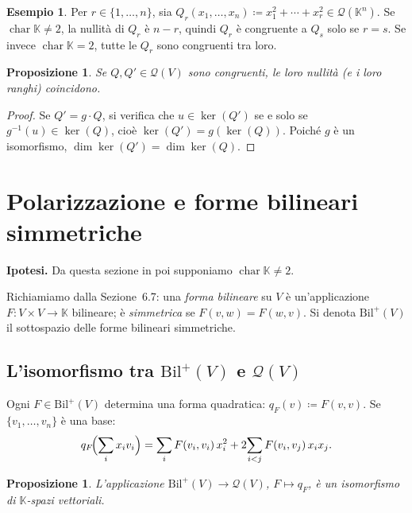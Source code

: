 \documentclass[11pt, a4paper]{book}
\theoremstyle{definition}
\newtheorem{esempio}[definizione]{Esempio}
\theoremstyle{plain}
\newtheorem{proposizione}[definizione]{Proposizione}
\theoremstyle{remark}
\newcommand{\K}{\mathbb{K}}
\DeclareMathOperator{\car}{char}
\begin{document}
\begin{exbox}
\begin{esempio}
Per $r \in \{1,\ldots,n\}$, sia $Q_r(x_1,\ldots,x_n) \coloneqq x_1^2+\cdots+x_r^2 \in \mathcal{Q}(\K^n)$. Se $\car\K \neq 2$, la nullità di $Q_r$ è $n-r$, quindi $Q_r$ è congruente a $Q_s$ solo se $r = s$. Se invece $\car\K = 2$, tutte le $Q_r$ sono congruenti tra loro.
\end{esempio}
\end{exbox}

\begin{proposizione}
\label{prop:ker-congruenza}
Se $Q, Q' \in \mathcal{Q}(V)$ sono congruenti, le loro nullità (e i loro ranghi) coincidono.
\end{proposizione}

\begin{proof}
Se $Q' = g \cdot Q$, si verifica che $u \in \ker(Q')$ se e solo se $g^{-1}(u) \in \ker(Q)$, cioè $\ker(Q') = g(\ker(Q))$. Poiché $g$ è un isomorfismo, $\dim\ker(Q') = \dim\ker(Q)$.
\end{proof}

\section{Polarizzazione e forme bilineari simmetriche}
\label{sec:polarizzazione}

\textbf{Ipotesi.} Da questa sezione in poi supponiamo $\car\K \neq 2$.

Richiamiamo dalla Sezione~6.7: una \emph{forma bilineare} su $V$ è un'applicazione $F \colon V \times V \to \K$ bilineare; è \emph{simmetrica} se $F(v,w) = F(w,v)$. Si denota $\mathrm{Bil}^+(V)$ il sottospazio delle forme bilineari simmetriche.

\subsection{L'isomorfismo tra $\mathrm{Bil}^+(V)$ e $\mathcal{Q}(V)$}

Ogni $F \in \mathrm{Bil}^+(V)$ determina una forma quadratica: $q_F(v) \coloneqq F(v,v)$. Se $\{v_1,\ldots,v_n\}$ è una base:
\[
  q_F\!\Bigl(\sum_i x_iv_i\Bigr) = \sum_{i} F(v_i,v_i)\,x_i^2 + 2\!\sum_{i<j} F(v_i,v_j)\,x_ix_j.
\]

\begin{proposizione}
\label{prop:iso-bil-qf}
L'applicazione $\mathrm{Bil}^+(V) \to \mathcal{Q}(V)$, $F \mapsto q_F$, è un isomorfismo di $\K$-spazi vettoriali.
\end{proposizione}
\end{document}
